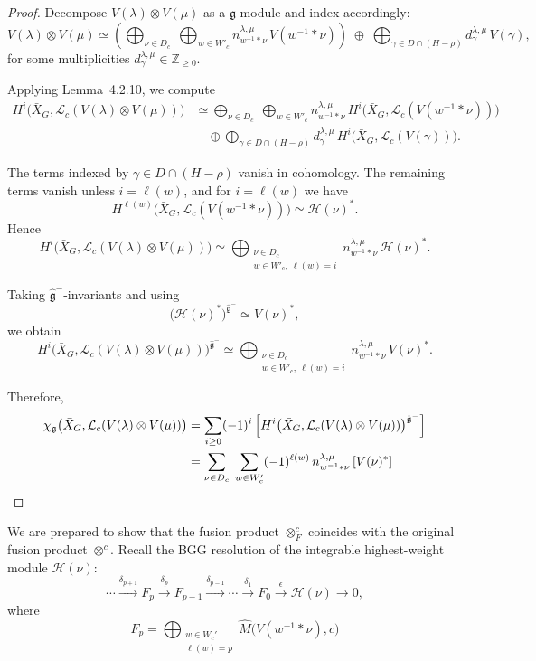 \documentclass[12pt]{article}
\begin{document}
\begin{proof}
Decompose $V(\lambda)\otimes V(\mu)$ as a $\mathfrak g$-module and index accordingly:
\begin{equation}\label{eq:decomp}
V(\lambda)\otimes V(\mu)
\simeq
\left(
\bigoplus_{\nu\in D_c}\;\bigoplus_{w\in W'_c}
n^{\lambda,\mu}_{w^{-1}*\nu}\, V(w^{-1}*\nu)
\right)
\;\oplus\;
\bigoplus_{\gamma\in D\cap(H-\rho)}
d^{\lambda,\mu}_\gamma\, V(\gamma),
\end{equation}
for some multiplicities $d^{\lambda,\mu}_\gamma\in\mathbb Z_{\ge0}$.

Applying Lemma~4.2.10, we compute
\begin{align*}
H^i\bigl(\bar X_G,\mathcal L_c(V(\lambda)\otimes V(\mu))\bigr)
&\simeq
\bigoplus_{\nu\in D_c}\;\bigoplus_{w\in W'_c}
n^{\lambda,\mu}_{w^{-1}*\nu}\,
H^i\bigl(\bar X_G,\mathcal L_c(V(w^{-1}*\nu))\bigr) \\
&\quad\oplus
\bigoplus_{\gamma\in D\cap(H-\rho)}
d^{\lambda,\mu}_\gamma\,
H^i\bigl(\bar X_G,\mathcal L_c(V(\gamma))\bigr).
\end{align*}

The terms indexed by $\gamma\in D\cap(H-\rho)$ vanish in cohomology. The remaining terms vanish unless $i=\ell(w)$, and for $i=\ell(w)$ we have
\[
H^{\ell(w)}\bigl(\bar X_G,\mathcal L_c(V(w^{-1}*\nu))\bigr)
\simeq \mathcal H(\nu)^*.
\]
Hence
\begin{equation}\label{eq:cohomology}
H^i\bigl(\bar X_G,\mathcal L_c(V(\lambda)\otimes V(\mu))\bigr)
\simeq
\bigoplus_{\substack{\nu\in D_c \\ w\in W'_c,\ \ell(w)=i}}
n^{\lambda,\mu}_{w^{-1}*\nu}\,
\mathcal H(\nu)^*.
\end{equation}

Taking $\hat{\mathfrak g}^{-}$-invariants and using
\[
\bigl(\mathcal H(\nu)^*\bigr)^{\hat{\mathfrak g}^{-}} \simeq V(\nu)^*,
\]
we obtain
\[
H^i\bigl(\bar X_G,\mathcal L_c(V(\lambda)\otimes V(\mu))\bigr)^{\hat{\mathfrak g}^{-}}
\simeq
\bigoplus_{\substack{\nu\in D_c \\ w\in W'_c,\ \ell(w)=i}}
n^{\lambda,\mu}_{w^{-1}*\nu}\, V(\nu)^*.
\]

Therefore,
\begin{align*}
\chi_{\mathfrak g}\bigl(\bar X_G,\mathcal L_c(V(\lambda)\otimes V(\mu))\bigr)
&=
\sum_{i\ge0} (-1)^i
\left[
H^i\bigl(\bar X_G,\mathcal L_c(V(\lambda)\otimes V(\mu))\bigr)^{\hat{\mathfrak g}^{-}}
\right] \\
&=
\sum_{\nu\in D_c}\;\sum_{w\in W'_c}
(-1)^{\ell(w)}\, n^{\lambda,\mu}_{w^{-1}*\nu}\,[V(\nu)^*] \qedhere
\end{align*} 
\end{proof}
We are prepared to show that the fusion product $\otimes_F^c$ coincides with the original fusion product $\otimes^c$.
Recall the BGG resolution of the integrable highest-weight module \(\mathcal H(\nu)\):
\[
\cdots \xrightarrow{\delta_{p+1}} F_p \xrightarrow{\delta_p} F_{p-1}
\xrightarrow{\delta_{p-1}} \cdots \xrightarrow{\delta_1} F_0
\xrightarrow{\epsilon} \mathcal H(\nu)\to 0,
\]
where
\[
F_p=\bigoplus_{\substack{w\in W_c'\\ \ell(w)=p}}
\widehat M\bigl(V(w^{-1}*\nu),c\bigr)
\]
\end{document}
